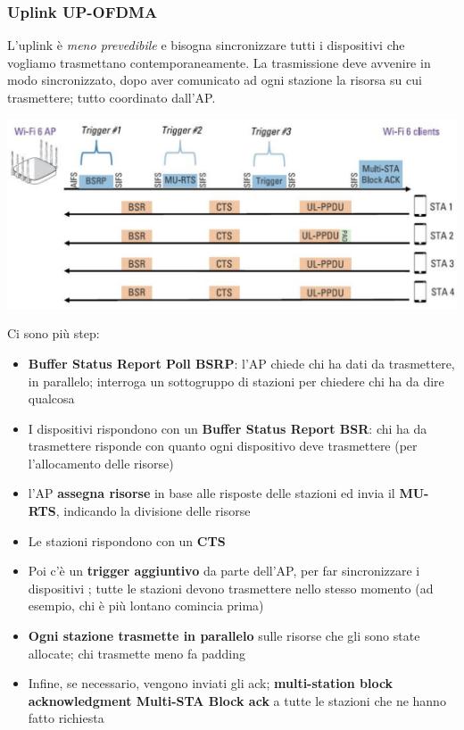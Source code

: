 \subsubsection{Uplink UP-OFDMA}
L'uplink è \textit{meno prevedibile} e bisogna sincronizzare tutti i dispositivi che vogliamo trasmettano contemporaneamente. La trasmissione deve avvenire in modo sincronizzato, dopo aver comunicato ad ogni stazione la risorsa su cui trasmettere; tutto coordinato dall'AP.
\begin{center}
	\includegraphics[width=0.85\linewidth]{img/wlan/uplink}
\end{center}

Ci sono più step:
\begin{itemize}
	\item \textbf{Buffer Status Report Poll BSRP}: l'AP chiede chi ha dati da trasmettere, in parallelo; interroga un sottogruppo di stazioni per chiedere chi ha da dire qualcosa
	\item I dispositivi rispondono con un \textbf{Buffer Status Report BSR}: chi ha da trasmettere risponde con quanto ogni dispositivo deve trasmettere (per l'allocamento delle risorse)
	\item l'AP \textbf{assegna risorse} in base alle risposte delle stazioni ed invia il \textbf{MU-RTS}, indicando la divisione delle risorse
	\item Le stazioni rispondono con un \textbf{CTS}
	\item Poi c'è un \textbf{trigger aggiuntivo} da parte dell'AP, per far sincronizzare i dispositivi ; tutte le stazioni devono trasmettere nello stesso momento (ad esempio, chi è più lontano comincia prima)
	\item \textbf{Ogni stazione trasmette in parallelo} sulle risorse che gli sono state allocate; chi trasmette meno fa padding
	\item Infine, se necessario, vengono inviati gli ack; \textbf{multi-station block acknowledgment Multi-STA Block ack} a tutte le stazioni che ne hanno fatto richiesta
\end{itemize}

